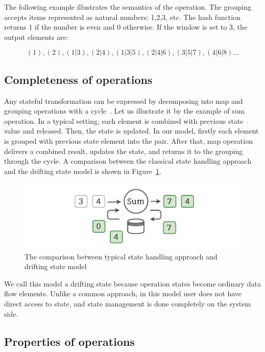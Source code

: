 The following example illustrates the semantics of the operation. The grouping accepts items represented as natural numbers: 1,2,3, etc. The hash function returns 1 if the number is even and 0 otherwise. If the window is set to 3, the output elements are:

\[(1), (2), (1|3), (2|4), (1|3|5), (2|4|6), (3|5|7), (4|6|8)...\]

\subsection{Completeness of operations}

Any stateful transformation can be expressed by decomposing into map and grouping operations with a cycle~\cite{we2018adbis}. Let us illustrate it by the example of sum operation. In a typical setting, each element is combined with previous state value and released. Then, the state is updated. In our model, firstly each element is grouped with previous state element into the pair. After that, map operation delivers a combined result, updates the state, and returns it to the grouping through the cycle. A comparison between the classical state handling approach and the drifting state model is shown in Figure~\ref{classical-drifting}.

\begin{figure}[htbp]
  \centering
  \includegraphics[width=.49\textwidth]{pics/classical-drifting}
  \caption{The comparison between typical state handling approach and drifting state model}
  \label {classical-drifting}
\end{figure}

We call this model a drifting state because operation states become ordinary data flow elements. Unlike a common approach, in this model user does not have direct access to state, and state management is done completely on the system side.

\subsection{Properties of operations}

